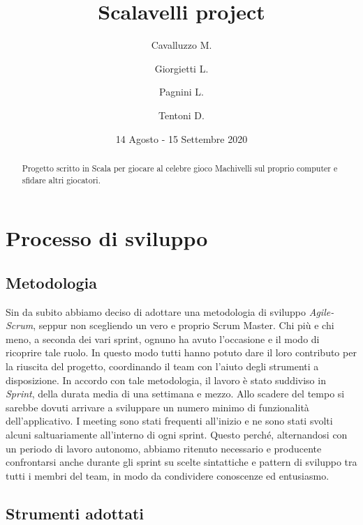 \documentclass[a4paper,10pt]{article}
\title{Scalavelli project}
\date{14 Agosto - 15 Settembre 2020}
\author{
Cavalluzzo M.
\and
Giorgietti L.
\and
Pagnini L.
\and
Tentoni D.
}
\begin{document}
    \maketitle
    \newpage

    \begin{abstract}
        Progetto scritto in Scala per giocare al celebre gioco Machivelli sul proprio computer e sfidare altri giocatori.
    \end{abstract}

    \tableofcontents

    \newpage


    \section{Processo di sviluppo}\label{sec:processo-di-sviluppo}

    \subsection{Metodologia}
    Sin da subito abbiamo deciso di adottare una metodologia di sviluppo \textit{Agile-Scrum}, seppur non scegliendo un vero e proprio Scrum Master.
    Chi più e chi meno, a seconda dei vari sprint, ognuno ha avuto l'occasione e il modo di ricoprire tale ruolo.
    In questo modo tutti hanno potuto dare il loro contributo per la riuscita del progetto, coordinando il team con l'aiuto degli strumenti a disposizione.
    In accordo con tale metodologia, il lavoro è stato suddiviso in \textit{Sprint}, della durata media di una settimana e mezzo.
    Allo scadere del tempo si sarebbe dovuti arrivare a sviluppare un numero minimo di funzionalità dell'applicativo.
    I meeting sono stati frequenti all'inizio e ne sono stati svolti alcuni saltuariamente all'interno di ogni sprint.
    Questo perché, alternandosi con un periodo di lavoro autonomo, abbiamo ritenuto necessario e producente confrontarsi anche durante gli sprint su scelte sintattiche e pattern di sviluppo tra tutti i membri del team, in modo da condividere conoscenze ed entusiasmo.

    \subsection{Strumenti adottati}
\end{document}
